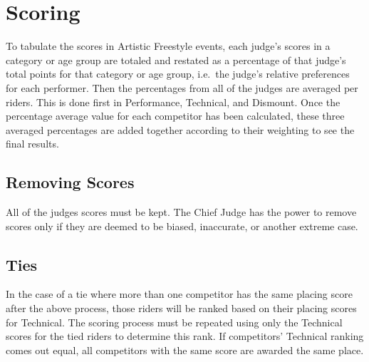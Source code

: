 \section{Scoring}
To tabulate the scores in Artistic Freestyle events, each judge's scores in a category or age group are totaled and restated as a percentage of that judge's total points for that category or age group, i.e.\ the judge's relative preferences for each performer.
Then the percentages from all of the judges are averaged per riders.
This is done first in Performance, Technical, and Dismount.
Once the percentage average value for each competitor has been calculated, these three averaged percentages are added together according to their weighting to see the final results.

\subsection{Removing Scores}
All of the judges scores must be kept.
The Chief Judge has the power to remove scores only if they are deemed to be biased, inaccurate, or another extreme case.

\subsection{Ties}
In the case of a tie where more than one competitor has the same placing score after the above process, those riders will be ranked based on their placing scores for Technical.
The scoring process must be repeated using only the Technical scores for the tied riders to determine this rank.
If competitors' Technical ranking comes out equal, all competitors with the same score are awarded the same place.
